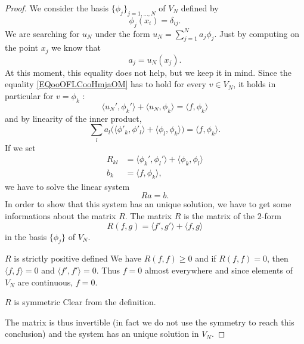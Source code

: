 \begin{proof}
    We consider the basis \( \{ \phi_j \}_{j=1,\ldots, N}\) of \( V_N\) defined by
    \begin{equation}
        \phi_j(x_i)=\delta_{ij}.
    \end{equation}
    We are searching for \( u_N\) under the form \( u_N=\sum_{j=1}^Na_j\phi_j\). Just by computing on the point \( x_j\) we know that
    \begin{equation}
        a_j=u_N(x_j).
    \end{equation}
    At this moment, this equality does not help, but we keep it in mind. Since the equality \eqref{EQooOFLCooHmjaOM} has to hold for every \( v \in V_N\), it holds in particular for \( v=\phi_k\) :
    \begin{equation}
        \langle u_N', \phi_k'\rangle +\langle u_N, \phi_k\rangle =\langle f, \phi_k\rangle 
    \end{equation}
    and by linearity of the inner product,
    \begin{equation}
        \sum_la_l\big( \langle \phi'_k, \phi'_l\rangle +\langle \phi_l, \phi_k\rangle  \big)=\langle f, \phi_k\rangle .
    \end{equation}
    If we set
    \begin{subequations}
        \begin{align}
            R_{kl}&=\langle \phi_k', \phi_l'\rangle +\langle \phi_k, \phi_l\rangle \\
            b_k&=\langle f, \phi_k\rangle,
        \end{align}
    \end{subequations}
    we have to solve the linear system
    \begin{equation}
        Ra=b.
    \end{equation}
    In order to show that this system has an unique solution, we have to get some informations about the matrix \( R\). The matrix \( R\) is the matrix of the \( 2\)-form
    \begin{equation}
        R(f,g)=\langle f', g'\rangle +\langle f, g\rangle 
    \end{equation}
    in the basis \( \{ \phi_j \}\) of \( V_N\).

    \begin{subproof}
        \item[\( R\) is strictly positive defined]
            We have \( R(f,f)\geq 0\) and if \( R(f,f)=0\), then \( \langle f, f\rangle =0\) and \( \langle f', f'\rangle =0\). Thus \( f=0\) almost everywhere and since elements of \( V_N\) are continuous, \( f=0\).
        \item[\( R\) is symmetric] Clear from the definition.
    \end{subproof}
    
    The matrix is thus invertible (in fact we do not use the symmetry to reach this conclusion) and the system has an unique solution in \( V_N\).
    
\end{proof}

